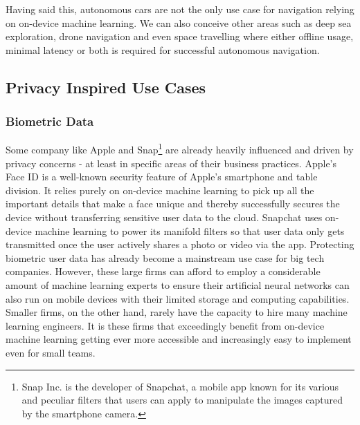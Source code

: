 \documentclass[
			   fontsize=11pt,
               paper=a4,
               bibliography=totoc,
               idxtotoc,
               headsepline,
               footsepline,
               footinclude=false,
               BCOR=12mm,
               DIV=13,
               openany,   %
               ]
               {scrbook}
\begin{document}
Having said this, autonomous cars are not the only use case for navigation relying on on-device machine learning. We can also conceive other areas such as deep sea exploration, drone navigation and even space travelling where either offline usage, minimal latency or both is required for successful autonomous navigation.

\subsection{Privacy Inspired Use Cases}

\subsubsection{Biometric Data}
Some company like Apple and Snap\footnote{Snap Inc. is the developer of Snapchat, a mobile app known for its various and peculiar filters that users can apply to manipulate the images captured by the smartphone camera.} are already heavily influenced and driven by privacy concerns - at least in specific areas of their business practices. Apple's Face ID is a well-known security feature of Apple's smartphone and table division. It relies purely on on-device machine learning to pick up all the important details that make a face unique and thereby successfully secures the device without transferring sensitive user data to the cloud. Snapchat uses on-device machine learning to power its manifold filters so that user data only gets transmitted once the user actively shares a photo or video via the app. Protecting biometric user data has already become a mainstream use case for big tech companies. However, these large firms can afford to employ a considerable amount of machine learning experts to ensure their artificial neural networks can also run on mobile devices with their limited storage and computing capabilities. Smaller firms, on the other hand, rarely have the capacity to hire many machine learning engineers. It is these firms that exceedingly benefit from on-device machine learning getting ever more accessible and increasingly easy to implement even for small teams.
\end{document}
